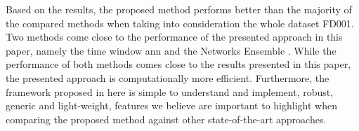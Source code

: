 Based on the results, the proposed method performs better than the majority of the compared methods when taking into consideration the whole dataset FD001. Two methods come close to the performance of the presented approach in this paper, namely the time window \gls{ann} \cite{Lim2016} and the Networks Ensemble \cite{Zhang2016}. While the performance of both methods comes close to the results presented in this paper, the presented approach is computationally more efficient. Furthermore, the framework proposed in here is simple to understand and implement, robust, generic and light-weight, features we believe are important to highlight when comparing the proposed method against other state-of-the-art approaches.

